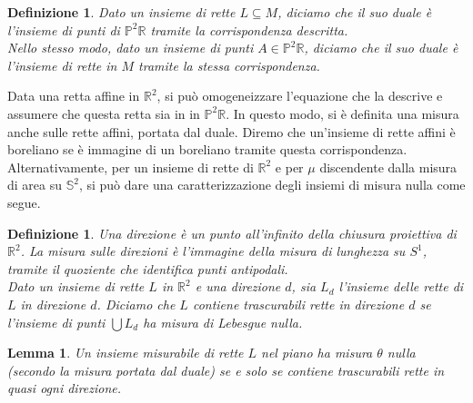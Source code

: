 \documentclass[a4paper, twoside,openright]{article}
\newcommand{\R}{\mathbb{R}}
\renewcommand{\P}{\mathbb{P}}
\renewcommand{\S}{\mathbb{S}}
\newcommand{\<}{\langle}
\renewcommand{\>}{\rangle}
\newtheorem{lemma}[teo]{Lemma}
\newtheorem{defin}[teo]{Definizione}
\begin{document}
\begin{defin}
	Dato un insieme di rette $L \subseteq M$, diciamo che il suo duale è l'insieme di punti di $\P^2 \R$ tramite la corrispondenza descritta.\\
	Nello stesso modo, dato un insieme di punti $A \in \P^2 \R$, diciamo che il suo duale è l'insieme di rette in $M$ tramite la stessa corrispondenza.
\end{defin}	

Data una retta affine in $\R^2$, si può omogeneizzare l'equazione che la descrive e assumere che questa retta sia in in $\P^2 \R$. In questo modo, si è definita una misura anche sulle rette affini, portata dal duale. Diremo che un'insieme di rette affini è boreliano se è immagine di un boreliano tramite questa corrispondenza.\\
Alternativamente, per un insieme di rette di $\R^2$ e per $\mu$ discendente dalla misura di area su $\S^2$, si può dare una caratterizzazione degli insiemi di misura nulla come segue.

\begin{defin}
Una direzione è un punto all'infinito della chiusura proiettiva di $\R^2$. La misura sulle direzioni è l'immagine della misura di lunghezza su $S^1$, tramite il quoziente che identifica punti antipodali.\\
Dato un insieme di rette $L$ in $\R^2$ e una direzione $d$, sia $L_{d}$ l'insieme delle rette di $L$ in direzione $d$. Diciamo che $L$ contiene trascurabili rette in direzione $d$ se l'insieme di punti $\bigcup L_{d}$ ha misura di Lebesgue nulla.
\end{defin}	

\begin{lemma}
	Un insieme misurabile di rette $L$ nel piano ha misura $\theta$ nulla (secondo la misura portata dal duale) se e solo se contiene trascurabili rette in quasi ogni direzione. 
\end{lemma}
\end{document}
